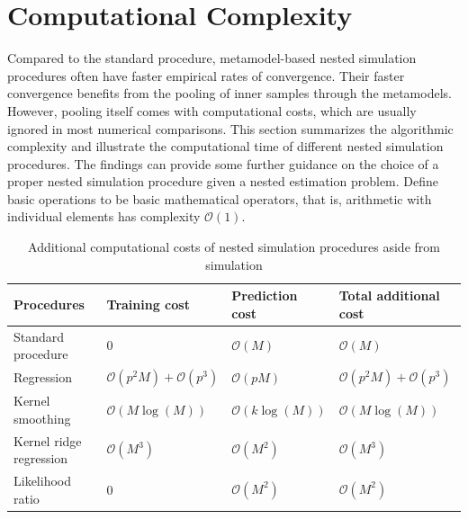 \section{Computational Complexity} \label{sec1:computational-complexity}
Compared to the standard procedure, metamodel-based nested simulation procedures often have faster empirical rates of convergence.
Their faster convergence benefits from the pooling of inner samples through the metamodels. 
However, pooling itself comes with computational costs, which are usually ignored in most numerical comparisons. 
This section summarizes the algorithmic complexity and illustrate the computational time of different nested simulation procedures.
The findings can provide some further guidance on the choice of a proper nested simulation procedure given a nested estimation problem.
Define basic operations to be basic mathematical operators, that is, arithmetic with individual elements has complexity $\mathcal{O}(1)$.

\begin{table}[ht]
    \centering  
    \small
    \begin{tabular}{llll}
    \hline
    \textbf{Procedures}      & \textbf{Training cost}                    &  \textbf{Prediction cost}    & \textbf{Total additional cost} \\ \hline \hline
    Standard procedure       &  $0$                                      &  $\mathcal{O}(M)$            & $\mathcal{O}(M)$ \\ 
    Regression               &  $\mathcal{O}(p^2M) + \mathcal{O}(p^3)$   &  $\mathcal{O}(pM)$           & $\mathcal{O}(p^2M) + \mathcal{O}(p^3)$ \\
    Kernel smoothing         &  $\mathcal{O}(M\log(M))$                  &  $\mathcal{O}(k\log(M))$     & $\mathcal{O}(M\log(M))$ \\
    Kernel ridge regression  &  $\mathcal{O}(M^3)$                       &  $\mathcal{O}(M^2)$          & $\mathcal{O}(M^3)$ \\
    Likelihood ratio         &  $0$                                      &  $\mathcal{O}(M^2)$          & $\mathcal{O}(M^2)$ \\
    \hline
    \end{tabular} 
    \caption{Additional computational costs of nested simulation procedures aside from simulation}
    \label{tab1:complexity}
\end{table}

